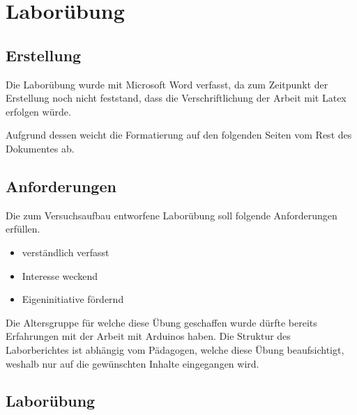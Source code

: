 \chapter{Laborübung}

\section{Erstellung}

Die Laborübung wurde mit Microsoft Word verfasst, da zum Zeitpunkt der Erstellung noch nicht feststand, dass die Verschriftlichung der Arbeit mit Latex erfolgen würde.

Aufgrund dessen weicht die Formatierung auf den folgenden Seiten vom Rest des Dokumentes ab.

\section{Anforderungen}

Die zum Versuchsaufbau entworfene Laborübung soll folgende Anforderungen erfüllen.

\begin{itemize}
    \item verständlich verfasst
    \item Interesse weckend
    \item Eigeninitiative fördernd
\end{itemize}

Die Altersgruppe für welche diese Übung geschaffen wurde dürfte bereits Erfahrungen mit der Arbeit mit Arduinos haben.
Die Struktur des Laborberichtes ist abhängig vom Pädagogen, welche diese Übung beaufsichtigt, weshalb nur auf die gewünschten Inhalte eingegangen wird.

\section{Laborübung}

\label{labuebung}
